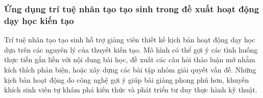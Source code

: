 \subsubsection{Ứng dụng trí tuệ nhân tạo tạo sinh trong đề xuất hoạt động dạy học kiến tạo}
Trí tuệ nhân tạo tạo sinh hỗ trợ giảng viên thiết kế kịch bản hoạt động dạy học dựa trên các nguyên lý của thuyết kiến tạo. Mô hình có thể gợi ý các tình huống thực tiễn gắn liền với nội dung bài học, đề xuất các câu hỏi thảo luận mở nhằm kích thích phản biện, hoặc xây dựng các bài tập nhóm giải quyết vấn đề. Những kịch bản hoạt động do công nghệ gợi ý giúp bài giảng phong phú hơn, khuyến khích sinh viên tự khám phá kiến thức và phát triển tư duy thực hành kỹ thuật.
